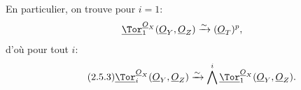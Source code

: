 En particulier, on trouve pour \(i=1\):
\[
\underline{\Tor}_1^{\underline{O}_X}(\underline{O}_Y,\underline{O}_Z)\xrightarrow{\sim}(\underline{O}_T)^p,
\]
d'où pour tout \(i\):
\begin{equation}\tag{2.5.3}
\underline{\Tor}_i^{\underline{O}_X}(\underline{O}_Y,\underline{O}_Z)
\xrightarrow{\sim}
\bigwedge^i\underline{\Tor}_1^{\underline{O}_X}(\underline{O}_Y,\underline{O}_Z).
\end{equation}

